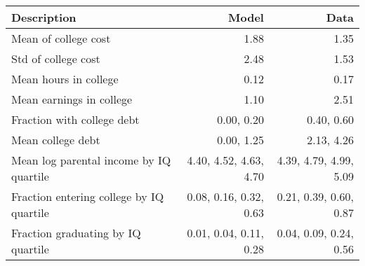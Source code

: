\begin{tabular}{lrr}
\hline
Description & Model  & Data  \\
\hline
Mean of college cost & 1.88  & 1.35  \\
Std of college cost & 2.48  & 1.53  \\
Mean hours in college & 0.12  & 0.17  \\
Mean earnings in college & 1.10  & 2.51  \\
Fraction with college debt & 0.00, 0.20  & 0.40, 0.60  \\
Mean college debt & 0.00, 1.25  & 2.13, 4.26  \\
Mean log parental income by IQ quartile & 4.40, 4.52, 4.63, 4.70  & 4.39, 4.79, 4.99, 5.09  \\
Fraction entering college by IQ quartile & 0.08, 0.16, 0.32, 0.63  & 0.21, 0.39, 0.60, 0.87  \\
Fraction graduating by IQ quartile & 0.01, 0.04, 0.11, 0.28  & 0.04, 0.09, 0.24, 0.56  \\
\hline
\end{tabular}%
